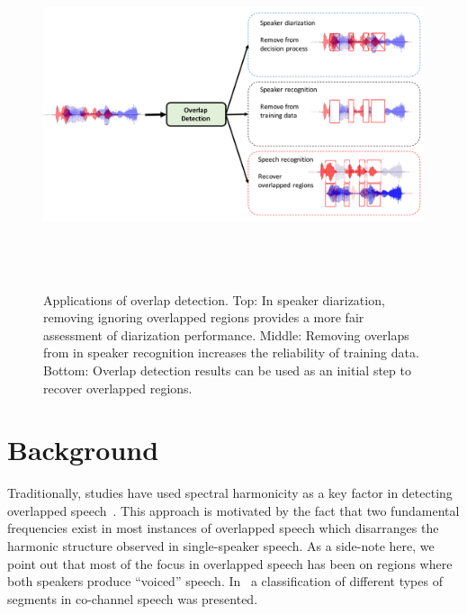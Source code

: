 \begin{figure}[h!]
	\centering
	\vspace{0mm}
	\includegraphics[height = 4in, width=1\textwidth]{figures/overlap_detection_applications}
	\vspace{-3mm}
	\caption{ Applications of overlap detection. Top: In speaker diarization, removing ignoring overlapped regions provides a more fair assessment of diarization performance. Middle: Removing overlaps from in speaker recognition increases the reliability of training data. Bottom: Overlap detection results can be used as an initial step to recover overlapped regions.}
	\label{fig:ch2_overlap_applications}
	\vspace{-3mm}
\end{figure}


\newpage
\section{Background}
\label{sec:ch2_methods}

Traditionally, studies have used spectral harmonicity as a key factor in detecting overlapped speech~\cite{nav_icassp13,smolenski_tut}. 
This approach is motivated by the fact that two fundamental frequencies exist in most instances of overlapped speech which disarranges the harmonic structure observed in single-speaker speech. 
As a side-note here, we point out that most of the focus in overlapped speech has been on regions where both speakers produce ``voiced'' speech. In~\cite{morgan_cochannel} a classification of different types of segments in co-channel speech was presented.

